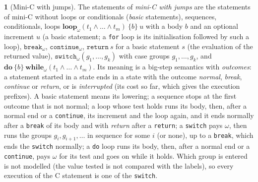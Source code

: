 \documentclass[oneside,english]{amsart}
\numberwithin{equation}{section}
\numberwithin{figure}{section}
\theoremstyle{plain}
\theoremstyle{definition}
\newtheorem{defn}[thm]{\protect\definitionname}
\theoremstyle{plain}
\theoremstyle{remark}
\theoremstyle{plain}
\theoremstyle{definition}
\theoremstyle{plain}
\theoremstyle{remark}
\providecommand{\definitionname}{Definition}
\begin{document}
\begin{defn}[Mini-C with jumps]
\label{def:minic-jumps}
The statements of \emph{mini-C with jumps} are the statements of mini-C without loops or conditionals (\emph{basic} statements), sequences, conditionals, loops $\mathbf{loop}_\omega(t_1 \wedge \dots \wedge t_m)\ \{b\}\ u$ with a body $b$ and an optional increment $u$ (a basic statement; a \texttt{for} loop is its initialisation followed by such a loop), $\mathtt{break}_\omega$, $\mathtt{continue}_\omega$, $\mathtt{return}\ s$ for a basic statement $s$ (the evaluation of the returned value), $\mathtt{switch}_\omega(g_1, \dots, g_k)$ with case groups $g_1, \dots, g_k$, and $\mathbf{do}\ \{b\}\ \mathbf{while}_\omega(t_1 \wedge \dots \wedge t_m)$. Its meaning is a big-step semantics with \emph{outcomes}: a statement started in a state ends in a state with the outcome \emph{normal}, \emph{break}, \emph{continue} or \emph{return}, or is \emph{interrupted} (its cost so far, which gives the execution prefixes). A basic statement means its lowering; a sequence stops at the first outcome that is not normal; a loop whose test holds runs its body, then, after a normal end or a \texttt{continue}, its increment and the loop again, and it ends normally after a \texttt{break} of its body and with \emph{return} after a \texttt{return}; a \texttt{switch} pays $\omega$, then runs the groups $g_i, g_{i+1}, \dots$ in sequence for some $i$ (or none), up to a \texttt{break}, which ends the \texttt{switch} normally; a \texttt{do} loop runs its body, then, after a normal end or a \texttt{continue}, pays $\omega$ for its test and goes on while it holds. Which group is entered is not modelled (the value tested is not compared with the labels), so every execution of the C statement is one of the \texttt{switch}.
\end{defn}
\end{document}
